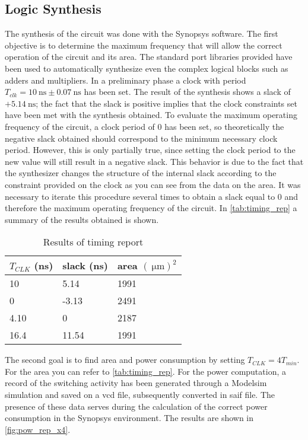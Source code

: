 \subsection{Logic Synthesis}

The synthesis of the circuit was done with the Synopsys software. The first objective is to determine the maximum frequency that will allow the correct operation of the circuit and its area. The standard port libraries provided have been used to automatically synthesize even the complex logical blocks such as adders and multipliers.
In a preliminary phase a clock with period $T_{clk} = \SI{10}{\nano\second} \pm \SI{0.07}{\nano\second}$ has been set. The result of the synthesis shows a slack of $+\SI{5.14}{\nano\second}$; the fact that the slack is positive implies that the clock constraints set have been met with the synthesis obtained.
To evaluate the maximum operating frequency of the circuit, a clock period of 0 has been set, so theoretically the negative slack obtained should correspond to the minimum necessary clock period. However, this is only partially true, since setting the clock period to the new value will still result in a negative slack. This behavior is due to the fact that the synthesizer changes the structure of the internal slack according to the constraint provided on the clock as you can see from the data on the area. It was necessary to iterate this procedure several times to obtain a slack equal to 0 and therefore the maximum operating frequency of the circuit. In \autoref{tab:timing_rep} a summary of the results obtained is shown.

\begin{table}[h]
\begin{center}
\begin{tabular}{|l|l|l|}
\hline
$T_{CLK}$ (ns) & slack (ns) & area $(\SI{}{\micro\meter})^2$ \\
\hline
10 & 5.14 & 1991 \\
0 & -3.13 & 2491 \\
4.10 & 0 & 2187 \\
16.4 & 11.54 & 1991 \\
\hline
\end{tabular}
\end{center}
\caption{Results of timing report}
\label{tab:timing_rep}
\end{table}

The second goal is to find area and power consumption by setting $T_{CLK} = 4 T_{min}$. For the area you can refer to \autoref{tab:timing_rep}. For the power computation, a record of the switching activity has been generated through a Modelsim simulation and saved on a vcd file, subsequently converted in saif file. The presence of these data serves during the calculation of the correct power consumption in the Synopsys environment. The results are shown in \autoref{fig:pow_rep_x4}.

